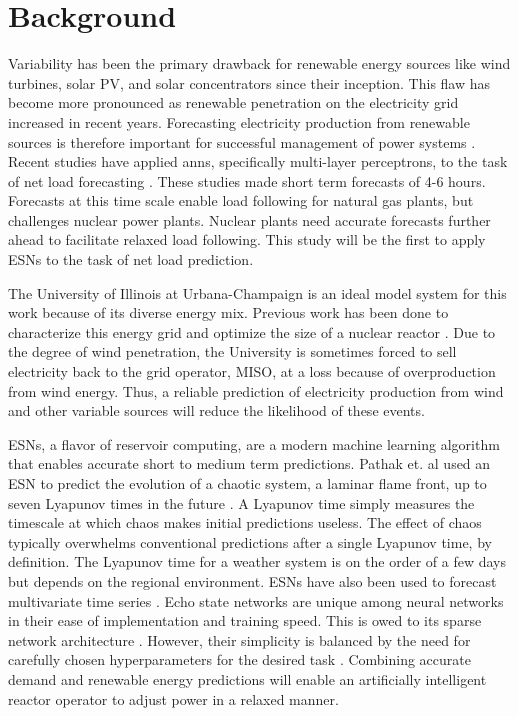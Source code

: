 \section{Background}
Variability has been the primary drawback for renewable energy sources like
wind turbines, solar PV, and solar concentrators since their inception. This
flaw has become more pronounced as renewable penetration on the electricity
grid increased in recent years. Forecasting electricity production from
renewable sources is therefore important for successful management of power
systems \cite{kobylinski_high-resolution_2020}. Recent studies have applied
\glspl{ann}, specifically multi-layer perceptrons, to the task of net load
forecasting \cite{kobylinski_high-resolution_2020,dutta_load_2017,lee_development_2016}. These studies made short
term forecasts of 4-6 hours. Forecasts at this time scale enable load following
for natural gas plants, but challenges nuclear power plants. Nuclear plants
need accurate forecasts further ahead to facilitate relaxed load following.
This study will be the first to apply \glspl{ESN} to the task of net load
prediction.

The University of Illinois at Urbana-Champaign is an ideal model system for
this work because of its diverse energy mix. Previous work has been done to
characterize this energy grid and optimize the size of a nuclear reactor
\cite{dotson_optimal_2020}. Due to the degree of wind penetration, the
University is sometimes
forced to sell electricity back to the grid operator, MISO, at a loss because
of overproduction
from wind energy. Thus, a reliable prediction of electricity production from
wind and other variable sources will reduce the likelihood of these events.

\glspl{ESN}, a flavor of reservoir computing, are a modern
machine learning algorithm that enables accurate short
to medium term predictions. Pathak et. al used an \gls{ESN} to predict the
evolution of a chaotic system, a laminar flame front, up to seven Lyapunov
times in the future \cite{pathak_model-free_2018, wikner_combining_2020}. A
Lyapunov time simply measures the timescale at which chaos makes initial
predictions useless. The effect of chaos typically overwhelms conventional
predictions after a single Lyapunov time, by definition.
The Lyapunov time for a weather system is on the order of a few days but
depends on the regional environment. \glspl{ESN} have also been used to
forecast multivariate time series \cite{bianchi_reservoir_2020}. Echo state
networks are unique among neural
networks in their ease of implementation and training speed. This is owed to its
sparse network architecture \cite{pathak_model-free_2018,
wikner_combining_2020, vannitsem_predictability_2017}. However,
their simplicity is balanced by the need for carefully chosen hyperparameters
for the desired task \cite{lukosevicius_practical_2012}.
Combining accurate demand and
renewable energy predictions will enable an artificially intelligent reactor
operator to adjust power in a relaxed manner.
